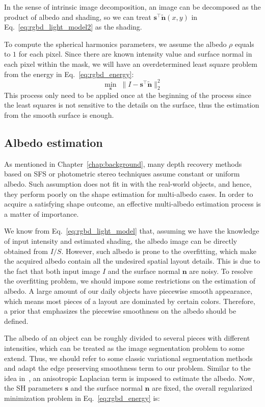In the sense of intrinsic image decomposition, an image can be decomposed as the product of albedo and shading, so we can treat $\mathbf{s}^\top \tilde{\mathbf{n}}(x,y) $ in Eq.~\ref{eq:rgbd_light_model2} as the shading.

To compute the spherical harmonics parameters, we assume the albedo $\rho$ equals to $1$ for each pixel. 
Since there are known intensity value and surface normal in each pixel within the mask, we will have an overdetermined least square problem from the energy in Eq.~\ref{eq:rgbd_energy}: 
\begin{equation}\label{eq:rgbd_light_estimate}
\min_{\mathbf{s}} \; \lVert I - \mathbf{s}^\top \tilde{\mathbf{n}} \rVert^2_2
\end{equation}
This process only need to be applied once at the beginning of the process since the least squares is not sensitive to the details on the surface, thus the estimation from the smooth surface is enough.

\subsection{Albedo estimation}\label{sec:rgbd_albedo_estimation}
As mentioned in Chapter~\ref{chap:background}, many depth recovery methods based on SFS or photometric stereo techniques assume constant or uniform albedo.
Such assumption does not fit in with the real-world objects, and hence, they perform poorly on the shape estimation for multi-albedo cases.
In order to acquire a satisfying shape outcome, an effective multi-albedo estimation process is a matter of importance.

We know from Eq.~\ref{eq:rgbd_light_model} that, assuming we have the knowledge of input intensity and estimated shading, the albedo image can be directly obtained from $I/S$.
However, such albedo is prone to the overfitting, which make the acquired albedo contain all the undesired spatial layout details.
This is due to the fact that both input image $I$ and the surface normal $\mathbf{n}$ are noisy.
To resolve the overfitting problem, we should impose some restrictions on the estimation of albedo.
A large amount of our daily objects have piecewise smooth appearance, which means most pieces of a layout are dominated by certain colors.
Therefore, a prior that emphasizes the piecewise smoothness on the albedo should be defined.

The albedo of an object can be roughly divided to several pieces with different intensities, which can be treated as the image segmentation problem to some extend. 
Thus, we should refer to some classic variational segmentation methods and adapt the edge preserving smoothness term to our problem.
Similar to the idea in~\cite{casaca2014laplacian}, an anisotropic Laplacian term is imposed to estimate the albedo.
Now, the SH parameters $\mathbf{s}$ and the surface normal $\mathbf{n}$ are fixed, the overall regularized minimization problem in Eq.~\ref{eq:rgbd_energy} is:

